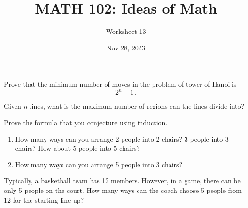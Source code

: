 \documentclass[12pt]{amsart}
\title{ MATH 102: Ideas  of Math }
\author{ Worksheet 13 }
\date{Nov 28, 2023}
\begin{document}
\maketitle

\begin{problem}
    Prove that the minimum number of moves in the problem of tower of
    Hanoi is 
    \begin{equation*}
        2^n - 1 \,.
    \end{equation*}
\end{problem}

\begin{problem}
  Given $n$ lines, what is the maximum number of regions can the lines divide into? 
  
  Prove the formula that you conjecture using induction.
\end{problem}

\begin{problem}
    \begin{enumerate}
        \item How many ways can you arrange 2 people into 2 chairs? 3 people into 3 chairs?
            How about 5 people into 5 chairs?
        \item How many ways can you arrange 5 people into 3 chairs?
    \end{enumerate}
\end{problem}

\begin{problem}
    Typically, a basketball team has 12 members. However, in a game, there 
    can be only 5 people on the court. How many ways can the coach choose 5 people
    from 12 for the starting line-up?
\end{problem}
\end{document}
